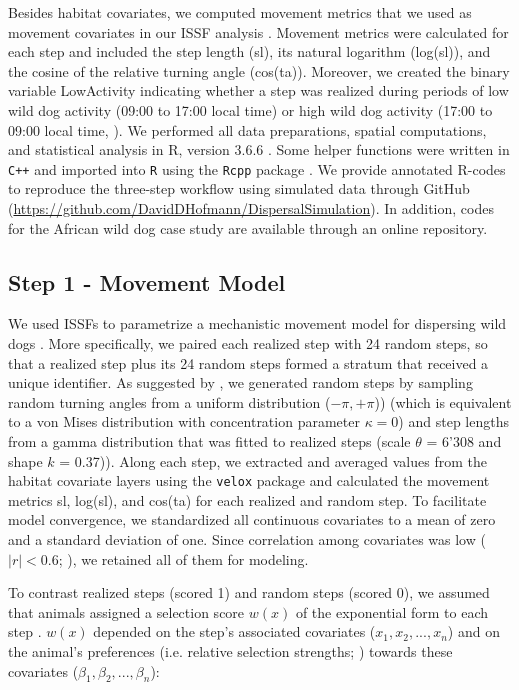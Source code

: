 \documentclass[abstract=on,10pt,a4paper,bibliography=totocnumbered]{article}
\begin{document}
Besides habitat covariates, we computed movement metrics that we used as
movement covariates in our ISSF analysis \citep{Avgar.2016, Fieberg.2021}.
Movement metrics were calculated for each step and included the step length
(\textsf{sl}), its natural logarithm (\textsf{log(sl)}), and the cosine of the
relative turning angle (\textsf{cos(ta)}).  Moreover, we created the binary
variable \textsf{LowActivity} indicating whether a step was realized during
periods of low wild dog activity (09:00 to 17:00 local time) or high wild dog
activity (17:00 to 09:00 local time, \citealp{Cozzi.2012}). We performed all
data preparations, spatial computations, and statistical analysis in R, version
3.6.6 \citep{R.2020}. Some helper functions were written in {\tt C++} and
imported into {\tt R} using the {\tt Rcpp} package \citep{Eddelbuettel.2011,
Eddelbuettel.2013}. We provide annotated R-codes to reproduce the three-step
workflow using simulated data through GitHub
(\url{https://github.com/DavidDHofmann/DispersalSimulation}). In addition, codes
for the African wild dog case study are available through an online repository.

\subsection{Step 1 - Movement Model}
We used ISSFs to parametrize a mechanistic movement model for dispersing wild
dogs \citep{Avgar.2016}. More specifically, we paired each realized step with 24
random steps, so that a realized step plus its 24 random steps formed a stratum
that received a unique identifier. As suggested by \cite{Avgar.2016}, we
generated random steps by sampling random turning angles from a uniform
distribution (\(-\pi, +\pi\))) (which is equivalent to a von Mises distribution
with concentration parameter \(\kappa = 0\)) and step lengths from a gamma
distribution that was fitted to realized steps (scale \(\theta\) = 6'308 and
shape \(k\) = 0.37)). Along each step, we extracted and averaged values from the
habitat covariate layers using the {\tt velox} package \citep{Hunziker.2021} and
calculated the movement metrics \textsf{sl}, \textsf{log(sl)}, and
\textsf{cos(ta)} for each realized and random step. To facilitate model
convergence, we standardized all continuous covariates to a mean of zero and a
standard deviation of one. Since correlation among covariates was low (\(|r| <
0.6\); \citealp{Latham.2011}), we retained all of them for modeling.

To contrast realized steps (scored 1) and random steps (scored 0), we assumed
that animals assigned a selection score \(w(x)\) of the exponential form to each
step \citep{Fortin.2005}. \(w(x)\) depended on the step's associated covariates
(\(x_1, x_2, ..., x_n\)) and on the animal's preferences (i.e. relative
selection strengths; \citealp{Avgar.2017}) towards these covariates (\(\beta_1,
\beta_2, ..., \beta_n\)):
\end{document}
